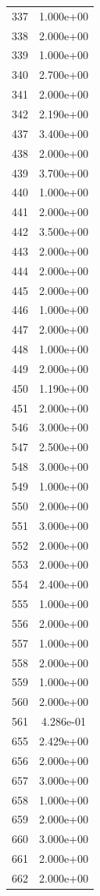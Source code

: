 \documentclass[12pt]{article}
\begin{document}
\begin{longtable}{@{}cc@{}}
337 & 1.000e+00 \\
338 & 2.000e+00 \\
339 & 1.000e+00 \\
340 & 2.700e+00 \\
341 & 2.000e+00 \\
342 & 2.190e+00 \\
437 & 3.400e+00 \\
438 & 2.000e+00 \\
439 & 3.700e+00 \\
440 & 1.000e+00 \\
441 & 2.000e+00 \\
442 & 3.500e+00 \\
443 & 2.000e+00 \\
444 & 2.000e+00 \\
445 & 2.000e+00 \\
446 & 1.000e+00 \\
447 & 2.000e+00 \\
448 & 1.000e+00 \\
449 & 2.000e+00 \\
450 & 1.190e+00 \\
451 & 2.000e+00 \\
546 & 3.000e+00 \\
547 & 2.500e+00 \\
548 & 3.000e+00 \\
549 & 1.000e+00 \\
550 & 2.000e+00 \\
551 & 3.000e+00 \\
552 & 2.000e+00 \\
553 & 2.000e+00 \\
554 & 2.400e+00 \\
555 & 1.000e+00 \\
556 & 2.000e+00 \\
557 & 1.000e+00 \\
558 & 2.000e+00 \\
559 & 1.000e+00 \\
560 & 2.000e+00 \\
561 & 4.286e-01 \\
655 & 2.429e+00 \\
656 & 2.000e+00 \\
657 & 3.000e+00 \\
658 & 1.000e+00 \\
659 & 2.000e+00 \\
660 & 3.000e+00 \\
661 & 2.000e+00 \\
662 & 2.000e+00 \\

\end{longtable}
\end{document}
